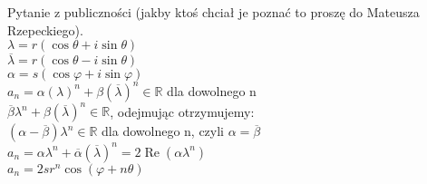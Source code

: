 \begin{uw} Pytanie z publiczności (jakby ktoś chciał je poznać to proszę do Mateusza Rzepeckiego).\\
    $\lambda = r(\cos\theta + i\sin\theta)$ \\ 
    $\overline\lambda = r(\cos\theta-i\sin\theta)$ \\ 
    $ \alpha = s(\cos\varphi + i\sin\varphi)$ \\ 
    $a_n = \alpha (\lambda)^n + \beta (\overline\lambda)^n \in \mathbb{R}$ dla dowolnego n \\
    $\overline\beta \lambda^n + \beta(\overline\lambda)^n \in \mathbb{R}$, odejmując otrzymujemy: \\ 
    $(\alpha - \overline\beta) \lambda^n \in \mathbb{R}$ dla dowolnego n, czyli $\alpha = \overline\beta$\\ 
    $a_n = \alpha \lambda^n + \overline\alpha (\overline\lambda)^n = 2 \operatorname{Re}(\alpha\lambda^n)$ \\ 
    $a_n = 2sr^n \cos(\varphi + n\theta)$
\end{uw} 
